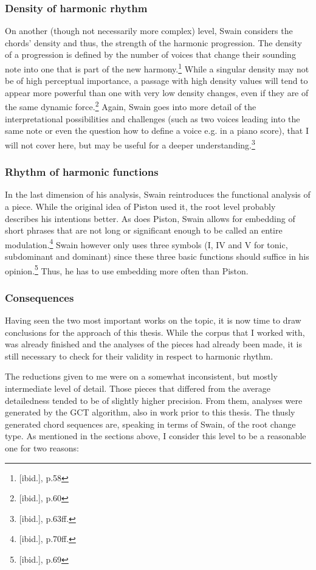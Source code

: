 \documentclass[a4paper,12pt]{report}
\begin{document}
\subsubsection{Density of harmonic rhythm}
On another (though not necessarily more complex) level, Swain considers the chords' density and thus, the strength of the harmonic progression. The density of a progression is defined by the number of voices that change their sounding note into one that is part of the new harmony.\footnote{[ibid.], p.58} While a singular density may not be of high perceptual importance, a passage with high density values will tend to appear more powerful than one with very low density changes, even if they are of the same dynamic force.\footnote{[ibid.], p.60} Again, Swain goes into more detail of the interpretational possibilities and challenges (such as two voices leading into the same note or even the question how to define a voice e.g. in a piano score), that I will not cover here, but may be useful for a deeper understanding.\footnote{[ibid.], p.63ff.}

\subsubsection{Rhythm of harmonic functions}
In the last dimension of his analysis, Swain reintroduces the functional analysis of a piece. While the original idea of Piston used it, the root level probably describes his intentions better. As does Piston, Swain allows for embedding of short phrases that are not long or significant enough to be called an entire modulation.\footnote{[ibid.], p.70ff.} Swain however only uses three symbols (I, IV and V for tonic, subdominant and dominant) since these three basic functions should suffice in his opinion.\footnote{[ibid.], p.69} Thus, he has to use embedding more often than Piston.

\subsubsection{Consequences}
Having seen the two most important works on the topic, it is now time to draw conclusions for the approach of this thesis. While the corpus that I worked with, was already finished and the analyses of the pieces had already been made, it is still necessary to check for their validity in respect to harmonic rhythm.

The reductions given to me were on a somewhat inconsistent, but mostly intermediate level of detail. Those pieces that differed from the average detailedness tended to be of slightly higher precision. From them, analyses were generated by the GCT algorithm, also in work prior to this thesis. The thusly generated chord sequences are, speaking in terms of Swain, of the root change type. As mentioned in the sections above, I consider this level to be a reasonable one for two reasons:
\end{document}
